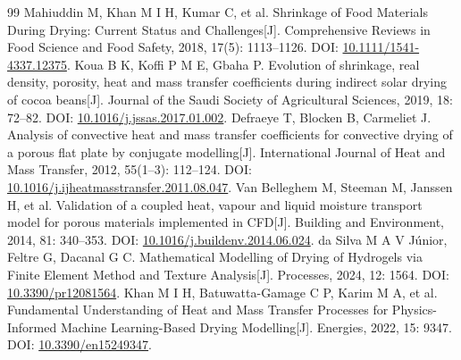 \documentclass[withoutpreface,bwprint]{cumcmthesis}
\begin{document}
\begin{thebibliography}{99}
 Mahiuddin M, Khan M I H, Kumar C, et al. Shrinkage of Food Materials During Drying: Current Status and Challenges[J]. Comprehensive Reviews in Food Science and Food Safety, 2018, 17(5): 1113--1126. DOI: \url{10.1111/1541-4337.12375}.
 Koua B K, Koffi P M E, Gbaha P. Evolution of shrinkage, real density, porosity, heat and mass transfer coefficients during indirect solar drying of cocoa beans[J]. Journal of the Saudi Society of Agricultural Sciences, 2019, 18: 72--82. DOI: \url{10.1016/j.jssas.2017.01.002}.
 Defraeye T, Blocken B, Carmeliet J. Analysis of convective heat and mass transfer coefficients for convective drying of a porous flat plate by conjugate modelling[J]. International Journal of Heat and Mass Transfer, 2012, 55(1--3): 112--124. DOI: \url{10.1016/j.ijheatmasstransfer.2011.08.047}.
 Van Belleghem M, Steeman M, Janssen H, et al. Validation of a coupled heat, vapour and liquid moisture transport model for porous materials implemented in CFD[J]. Building and Environment, 2014, 81: 340--353. DOI: \url{10.1016/j.buildenv.2014.06.024}.
 da Silva M A V Júnior, Feltre G, Dacanal G C. Mathematical Modelling of Drying of Hydrogels via Finite Element Method and Texture Analysis[J]. Processes, 2024, 12: 1564. DOI: \url{10.3390/pr12081564}.
 Khan M I H, Batuwatta-Gamage C P, Karim M A, et al. Fundamental Understanding of Heat and Mass Transfer Processes for Physics-Informed Machine Learning-Based Drying Modelling[J]. Energies, 2022, 15: 9347. DOI: \url{10.3390/en15249347}.
\end{thebibliography}
\end{document}
